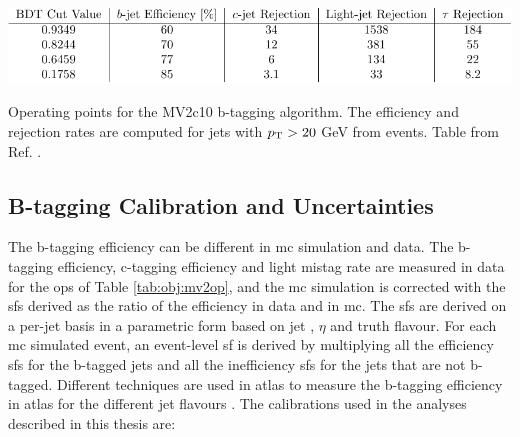 \begin{table}[h]
\begin{center}
    \includegraphics[width=1.0\textwidth]{figures/objects/btag_op.pdf}  
\end{center}
 \caption{Operating points for the MV2c10 b-tagging algorithm. The efficiency and rejection rates are computed for jets with $p_{\rm T} > 20$ GeV from \ttbar events. Table from Ref. \cite{ATL-PHYS-PUB-2016-012}.}
  \label{tab:obj:mv2op}
\end{table}

\subsection{B-tagging Calibration and Uncertainties}

The b-tagging efficiency can be different in \gls{mc} simulation and data. The b-tagging efficiency, 
c-tagging efficiency and light mistag rate are measured in data for the \glspl{op} of Table \ref{tab:obj:mv2op}, 
and the \gls{mc} simulation is corrected with the \glspl{sf} derived as the ratio of the efficiency in data and in \gls{mc}. 
The \glspl{sf} are derived on a per-jet basis in a parametric form based on jet \pt, $\eta$ and truth flavour. 
For each \gls{mc} simulated event, an event-level \gls{sf} is derived by multiplying all the efficiency \glspl{sf} for the b-tagged jets 
and all the inefficiency \glspl{sf} for the jets that are not b-tagged. Different techniques are used in \gls{atlas} to measure the b-tagging 
efficiency in \gls{atlas} for the different jet flavours \cite{1748-0221-11-04-P04008}.
The calibrations used in the analyses described in this thesis are:

